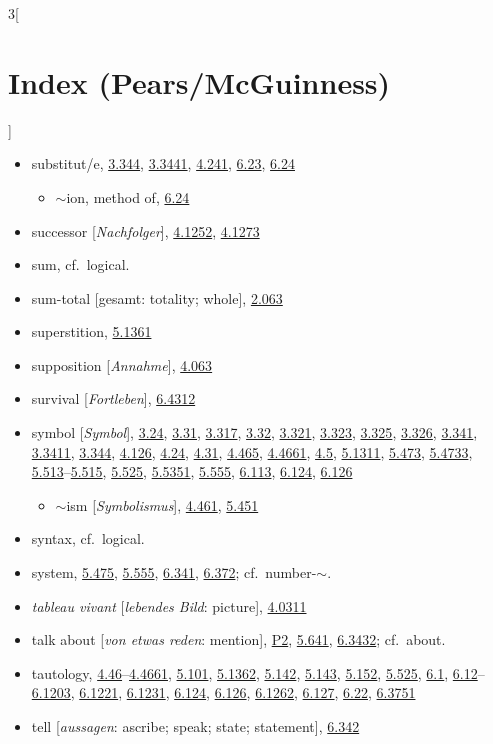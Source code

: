 \documentclass[oneside,openany,12pt]{book}
\newcommand{\indexentry}[1]{\item #1}
\newcommand{\indexsubentry}[1]{\begin{itemize} \item #1 \end{itemize}}
\newcommand{\indexref}[1]{\hyperlink{prop#1}{#1}}
\newcommand{\indexgap}{\bigskip}
\begin{document}
\begin{multicols}{3}[\section*{Index (Pears/McGuinness)}]
\begin{itemize}
\indexentry{substitut/e, \indexref{3.344}, \indexref{3.3441}, \indexref{4.241}, \indexref{6.23}, \indexref{6.24}}

   \indexsubentry{$\sim$ion, method of, \indexref{6.24}}

\indexentry{successor [\textit{Nachfolger}], \indexref{4.1252}, \indexref{4.1273}}

\indexentry{sum, cf.\ logical.}

\indexentry{sum-total [gesamt: totality; whole], \indexref{2.063}}

\indexentry{superstition, \indexref{5.1361}}

\indexentry{supposition [\textit{Annahme}], \indexref{4.063}}

\indexentry{survival [\textit{Fortleben}], \indexref{6.4312}}

\indexentry{symbol [\textit{Symbol}], \indexref{3.24}, \indexref{3.31}, \indexref{3.317}, \indexref{3.32}, \indexref{3.321}, \indexref{3.323}, \indexref{3.325}, \indexref{3.326}, \indexref{3.341}, \indexref{3.3411}, \indexref{3.344}, \indexref{4.126}, \indexref{4.24}, \indexref{4.31}, \indexref{4.465}, \indexref{4.4661}, \indexref{4.5}, \indexref{5.1311}, \indexref{5.473}, \indexref{5.4733}, \indexref{5.513}--\indexref{5.515}, \indexref{5.525}, \indexref{5.5351}, \indexref{5.555}, \indexref{6.113}, \indexref{6.124}, \indexref{6.126}}

   \indexsubentry{$\sim$ism [\textit{Symbolismus}], \indexref{4.461}, \indexref{5.451}}

\indexentry{syntax, cf.\ logical.}

\indexentry{system, \indexref{5.475}, \indexref{5.555}, \indexref{6.341}, \indexref{6.372}; cf.\ number-$\sim$.}

\indexgap

\indexentry{\textit{tableau vivant} [\textit{lebendes Bild}: picture], \indexref{4.0311}}

\indexentry{talk about [\textit{von etwas reden}: mention], \hyperlink{pref2}{P2}, \indexref{5.641}, \indexref{6.3432}; cf.\ about.}

\indexentry{tautology, \indexref{4.46}--\indexref{4.4661}, \indexref{5.101}, \indexref{5.1362}, \indexref{5.142}, \indexref{5.143}, \indexref{5.152}, \indexref{5.525}, \indexref{6.1}, \indexref{6.12}--\indexref{6.1203}, \indexref{6.1221}, \indexref{6.1231}, \indexref{6.124}, \indexref{6.126}, \indexref{6.1262}, \indexref{6.127}, \indexref{6.22}, \indexref{6.3751}}

\indexentry{tell [\textit{aussagen}: ascribe; speak; state; statement], \indexref{6.342}}


\end{itemize}
\end{multicols}
\end{document}
